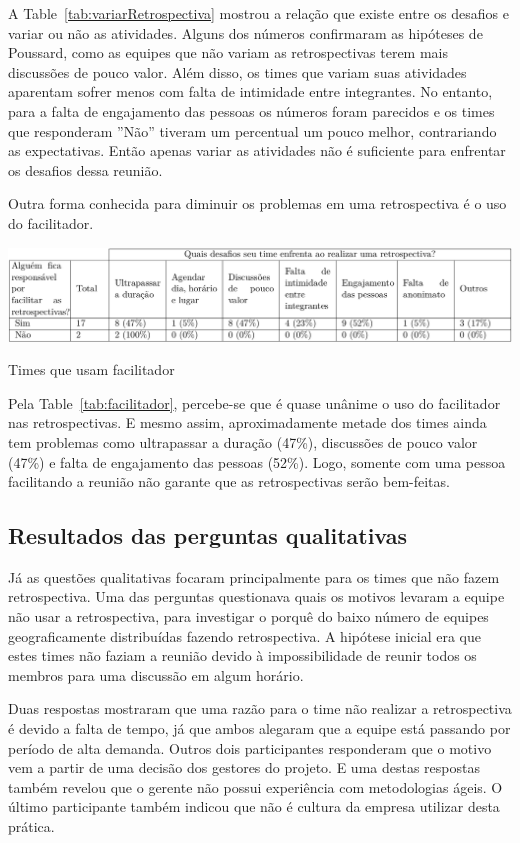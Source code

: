 \documentclass[12pt]{article}
\begin{document}
A Table~\ref{tab:variarRetrospectiva} mostrou a relação que existe entre os desafios e variar ou não as atividades. Alguns dos números confirmaram as hipóteses de Poussard, como as equipes que não variam as retrospectivas terem mais discussões de pouco valor. Além disso, os times que variam suas atividades aparentam sofrer menos com falta de intimidade entre integrantes. No entanto, para a falta de engajamento das pessoas os números foram parecidos e os times que responderam ''Não'' tiveram um percentual um pouco melhor, contrariando as expectativas. Então apenas variar as atividades não é suficiente para enfrentar os desafios dessa reunião.

Outra forma conhecida para diminuir os problemas em uma retrospectiva é o uso do facilitador. 

\begin{table}[ht]
\centering
\includegraphics[width=1\textwidth]{facilitador.png}
\caption{Times que usam facilitador}
\label{tab:facilitador}
\end{table}

Pela Table~\ref{tab:facilitador}, percebe-se que é quase unânime o uso do facilitador nas retrospectivas. E mesmo assim, aproximadamente metade dos times ainda tem problemas como ultrapassar a duração (47\%), discussões de pouco valor (47\%) e falta de engajamento das pessoas (52\%). Logo, somente com uma pessoa facilitando a reunião não garante que as retrospectivas serão bem-feitas.

\subsection{Resultados das perguntas qualitativas}

Já as questões qualitativas focaram principalmente para os times que não fazem retrospectiva. Uma das perguntas questionava quais os motivos levaram a equipe não usar a retrospectiva, para investigar o porquê do baixo número de equipes geograficamente distribuídas fazendo retrospectiva. A hipótese inicial era que estes times não faziam a reunião devido à impossibilidade de reunir todos os membros para uma discussão em algum horário.

Duas respostas mostraram que uma razão para o time não realizar a retrospectiva é devido a falta de tempo, já que ambos alegaram que a equipe está passando por período de alta demanda. Outros dois participantes responderam que o motivo vem a partir de uma decisão dos gestores do projeto. E uma destas respostas também revelou que o gerente não possui experiência com metodologias ágeis. O último participante também indicou que não é cultura da empresa utilizar desta prática. 
\end{document}
